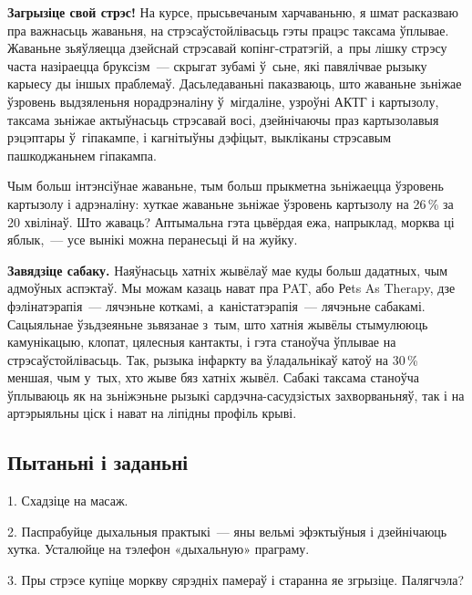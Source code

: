 \textbf{Загрызіце свой стрэс!} На курсе, прысьвечаным харчаваньню, я шмат расказваю пра важнасьць жаваньня, на стрэсаўстойлівасьць гэты працэс таксама ўплывае. Жаваньне зьяўляецца дзейснай стрэсавай копінг-стратэгій, а~пры лішку стрэсу часта назіраецца бруксізм~--- скрыгат зубамі ў~сьне, які павялічвае рызыку карыесу ды іншых праблемаў. Дасьледаваньні паказваюць, што жаваньне зьніжае ўзровень выдзяленьня норадрэналіну ў~мігдаліне, узроўні АКТГ і картызолу, таксама зьніжае актыўнасьць стрэсавай восі, дзейнічаючы праз картызолавыя рэцэптары ў~гіпакампе, і кагнітыўны дэфіцыт, выкліканы стрэсавым пашкоджаньнем гіпакампа.

Чым больш інтэнсіўнае жаваньне, тым больш прыкметна зьніжаецца ўзровень картызолу і адрэналіну: хуткае жаваньне зьніжае ўзровень картызолу на 26\,\% за 20 хвілінаў. Што жаваць? Аптымальна гэта цьвёрдая ежа, напрыклад, морква ці яблык,~--- усе вынікі можна перанесьці й на жуйку.

\textbf{Завядзіце сабаку.} Наяўнасьць хатніх жывёлаў мае куды больш дадатных, чым адмоўных аспэктаў. Мы можам казаць нават пра PAT, або Реts As Therapy, дзе фэлінатэрапія~--- лячэньне коткамі, а~каністатэрапія~--- лячэньне сабакамі. Сацыяльнае ўзьдзеяньне зьвязанае з~тым, што хатнія жывёлы стымулююць камунікацыю, клопат, цялесныя кантакты, і гэта станоўча ўплывае на стрэсаўстойлівасьць. Так, рызыка інфаркту ва ўладальнікаў катоў на 30\,\% меншая, чым у~тых, хто жыве бяз хатніх жывёл. Сабакі таксама станоўча ўплываюць як на зьніжэньне рызыкі сардэчна-сасудзістых захворваньняў, так і на артэрыяльны ціск і нават на ліпідны профіль крыві.


\subsection*{Пытаньні і заданьні}

1. Схадзіце на масаж.

2. Паспрабуйце дыхальныя практыкі~--- яны вельмі эфэктыўныя і дзейнічаюць хутка. Усталюйце на тэлефон «дыхальную» праграму.

3. Пры стрэсе купіце моркву сярэдніх памераў і старанна яе згрызіце. Палягчэла?


